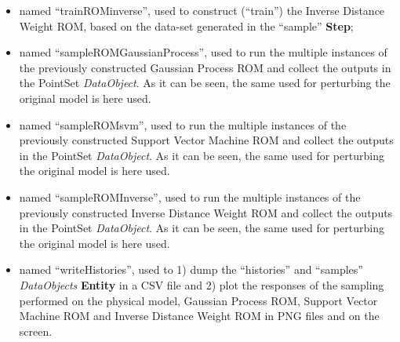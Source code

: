 \begin{enumerate}
\begin{itemize}
     \item {} named ``trainROMinverse'', used to construct (``train'')
     the Inverse Distance Weight ROM, based on the data-set generated in the  ``sample'' \textbf{Step};
     \item {} named ``sampleROMGaussianProcess'', used to run the multiple  
     instances of the previously constructed Gaussian Process ROM and 
     collect the outputs in the PointSet \textit{DataObject}. As it can be
     seen, the same  used for perturbing the original model is here used. 
     \item {} named ``sampleROMsvm'', used to run the multiple  
     instances of the previously constructed Support Vector Machine ROM and 
     collect the outputs in the PointSet \textit{DataObject}. As it can be
     seen, the same  used for perturbing the original model is here used.
     \item {} named ``sampleROMInverse'', used to run the multiple  
     instances of the previously constructed Inverse Distance Weight ROM and 
     collect the outputs in the PointSet \textit{DataObject}. As it can be
     seen, the same  used for perturbing the original model is here used.
     \item  {} named ``writeHistories'', used to 1) dump 
     the ``histories'' and ``samples''  \textit{DataObjects} 
     \textbf{Entity} in a CSV file and 2) plot the responses of the sampling performed on the physical model, Gaussian Process ROM,
     Support Vector Machine ROM and Inverse Distance Weight ROM in  PNG files and on the screen.
   \end{itemize}
\end{enumerate} 

